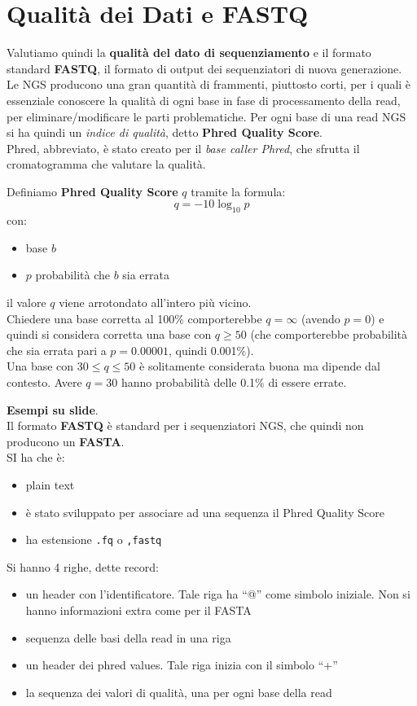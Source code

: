 \documentclass[a4paper,12pt, oneside]{book}
\begin{document}
\section{Qualità dei Dati e FASTQ}
Valutiamo quindi la \textbf{qualità del dato di sequenziamento} e il formato
standard \textbf{FASTQ}, il formato di output dei sequenziatori di nuova
generazione. \\ 
Le NGS producono una gran quantità di frammenti, piuttosto corti, per i quali è
essenziale conoscere la qualità di ogni base in fase di processamento della
read, per eliminare/modificare le parti problematiche. Per ogni base di una read
NGS si ha quindi un \textit{indice di qualità}, detto \textbf{Phred Quality
  Score}.\\
Phred, abbreviato, è stato creato per il \textit{base caller Phred}, che sfrutta
il cromatogramma che valutare la qualità.
\begin{definizione}
  Definiamo \textbf{Phred Quality Score} $q$ tramite la formula:
  \[q=-10\log_{10}p\]
  con:
  \begin{itemize}
    \item base $b$
    \item $p$ probabilità che $b$ sia errata
  \end{itemize}
  il valore $q$ viene arrotondato all'intero più vicino.\\
  Chiedere una base corretta al 100\% comporterebbe $q=\infty$ (avendo $p=0$) e
  quindi si considera corretta una base con $q\geq 50$ (che comporterebbe
  probabilità che sia errata pari a $p=0.00001$, quindi 0.001\%).\\
  Una base con $30\leq q\leq 50$ è solitamente considerata buona ma dipende dal
  contesto. Avere $q=30$ hanno probabilità delle 0.1\% di essere errate. 
\end{definizione}
\textbf{Esempi su slide}.\\
Il formato \textbf{FASTQ} è standard per i sequenziatori NGS, che quindi non
producono un \textbf{FASTA}.\\
SI ha che è:
\begin{itemize}
  \item plain text
  \item è stato sviluppato per associare ad una sequenza il Phred Quality Score
  \item ha estensione \texttt{.fq} o \texttt{,fastq}
\end{itemize}
Si hanno 4 righe, dette record:
\begin{itemize}
  \item un header con l'identificatore. Tale riga ha ``@'' come simbolo
  iniziale. Non si hanno informazioni extra come per il FASTA
  \item sequenza delle basi della read in una riga
  \item un header dei phred values. Tale riga inizia con il simbolo ``+''
  \item la sequenza dei valori di qualità, una per ogni base della read
\end{itemize}
\end{document}
